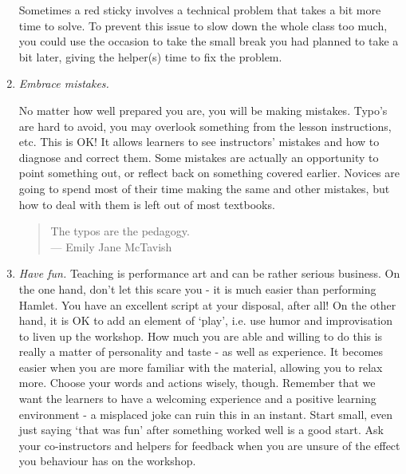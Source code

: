 \begin{enumerate}
\begin{itemize}
  \end{itemize}

  Sometimes a red sticky involves a technical problem that takes a bit
  more time to solve. To prevent this issue to slow down the whole
  class too much, you could use the occasion to take the small break
  you had planned to take a bit later, giving the helper(s) time to
  fix the problem.

\item
  \emph{Embrace mistakes.}

  No matter how well prepared you are, you will be making
  mistakes. Typo's are hard to avoid, you may overlook something from
  the lesson instructions, etc. This is OK! It allows learners to see
  instructors' mistakes and how to diagnose and correct them. Some
  mistakes are actually an opportunity to point something out, or
  reflect back on something covered earlier. Novices are going to
  spend most of their time making the same and other mistakes, but how
  to deal with them is left out of most textbooks.

  \begin{quote}
    The typos are the pedagogy.
    \\
    --- Emily Jane McTavish
  \end{quote}

\item
  \emph{Have fun.}  Teaching is performance art and can be rather
  serious business. On the one hand, don't let this scare you - it is
  much easier than performing Hamlet. You have an excellent script at
  your disposal, after all! On the other hand, it is OK to add an
  element of `play', i.e. use humor and improvisation to liven up the
  workshop. How much you are able and willing to do this is really a
  matter of personality and taste - as well as experience. It becomes
  easier when you are more familiar with the material, allowing you to
  relax more. Choose your words and actions wisely, though. Remember
  that we want the learners to have a welcoming experience and a
  positive learning environment - a misplaced joke can ruin this in an
  instant. Start small, even just saying `that was fun' after
  something worked well is a good start. Ask your co-instructors and
  helpers for feedback when you are unsure of the effect you behaviour
  has on the workshop.

\end{enumerate}


